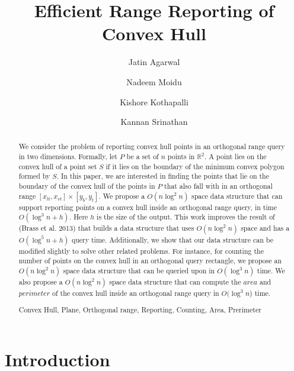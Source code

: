 \documentclass[runningheads,a4paper]{llncs}
\newcommand{\keywords}[1]{\par\addvspace\baselineskip
\noindent\keywordname\enspace\ignorespaces#1}
\begin{document}
\mainmatter  

\title{Efficient Range Reporting of Convex Hull}


\author{Jatin Agarwal \and Nadeem Moidu \and Kishore Kothapalli \and Kannan Srinathan}



\maketitle

\begin{abstract}

We consider the problem of reporting convex hull points in an orthogonal range query in two dimensions.
Formally, let $P$ be a set of $n$ points in $\mathbb{R}^{2}$.
A point lies on the convex hull of a  point set  $S$ if it lies on the
boundary of the minimum convex polygon formed by $S$. In this paper, we
are interested in finding the points that lie on the boundary of the
convex hull of the points in $P$ that also fall with in an orthogonal range
$[x_{lt},x_{rt}]\times{}[y_b, y_t]$. 
We propose a $O(n \log^{2} n) $ space data structure that can support reporting points on a convex hull inside
an orthogonal range query, in time $O(\log^{3} n + h)$. Here $h$ is the size of the output.
This work improves the result of (Brass et al. 2013) \cite{brass} that
builds a data structure that uses $O(n \log^{2} n)$ space and has a 
$O(\log^{5} n + h)$ query time. 
Additionally, we show that our data structure can be modified slightly to
solve other related problems. For instance, for counting the number of
points on the convex hull in an orthogonal query rectangle, we propose an
$O(n \log^{2}n)$ space data structure that can be queried upon in $O(\log^{3} n)$ time. 
We also propose a $O(n \log^{2} n) $ space data structure that can compute the $area$
and $perimeter$ of the convex hull inside an orthogonal range query in $O(\log^{3} n$) time.

\keywords{ Convex Hull, Plane, Orthogonal range, Reporting, Counting, Area, Prerimeter }
\end{abstract}


\section{Introduction}
\end{document}

